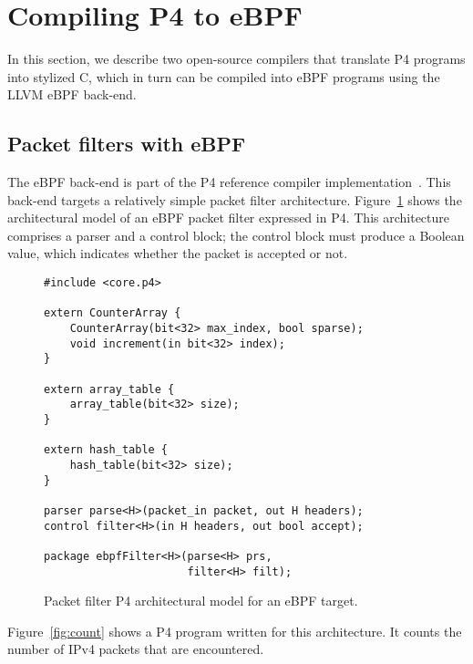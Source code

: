 \section{Compiling P4 to eBPF}\label{sec:compilation}

In this section, we describe two open-source compilers that translate
P4 programs into stylized C, which in turn can be compiled into
eBPF programs using the LLVM eBPF back-end.


\subsection{Packet filters with eBPF}\label{sec:ebpf}

The eBPF back-end is part of the P4 reference compiler
implementation~\cite{p4-ebpf-backend}.  This back-end targets a
relatively simple packet filter architecture.
Figure~\ref{fig:ebpf-model} shows the architectural model of an eBPF
packet filter expressed in P4.  This architecture comprises a parser
and a control block; the control block must produce a Boolean value,
which indicates whether the packet is accepted or not.

\begin{figure}[h]
\begin{lstlisting}
#include <core.p4>

extern CounterArray {
    CounterArray(bit<32> max_index, bool sparse);
    void increment(in bit<32> index);
}

extern array_table {
    array_table(bit<32> size);
}

extern hash_table {
    hash_table(bit<32> size);
}

parser parse<H>(packet_in packet, out H headers);
control filter<H>(in H headers, out bool accept);

package ebpfFilter<H>(parse<H> prs,
                      filter<H> filt);
\end{lstlisting}
\caption{Packet filter P4 architectural model for an eBPF
  target.}\label{fig:ebpf-model}
\end{figure}

Figure~\ref{fig:count} shows a P4 program written for this
architecture. It counts the number of IPv4 packets that are
encountered.

